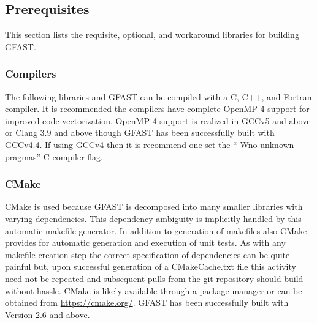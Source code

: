 \documentclass[12pt]{article}
\begin{document}
\subsection{Prerequisites}
This section lists the requisite, optional, and workaround libraries for building GFAST.   

\subsubsection{Compilers} 
The following libraries and GFAST can be compiled with a 
C, C++, and Fortran compiler.  It is recommended the compilers have complete 
\href{http://openmp.org/wp/}{OpenMP-4} support for improved code vectorization.  
OpenMP-4 support is realized in GCCv5 and above or Clang 3.9 and above though GFAST has
been successfully built with GCCv4.4.  If using GCCv4 then it is
recommend one set the ``-Wno-unknown-pragmas'' C compiler flag.

\subsubsection{CMake} CMake is used because GFAST is decomposed into many smaller libraries with 
varying dependencies.  This dependency ambiguity is implicitly handled by this automatic 
makefile generator. In addition to generation of makefiles also CMake provides for automatic generation
and execution of unit tests. As with any makefile creation step the correct 
specification of dependencies can be quite painful but, upon successful generation of a
CMakeCache.txt file this activity need not be repeated and subsequent pulls from the git
repository should build without hassle.  CMake is likely available through a package manager
or can be obtained from \url{https://cmake.org/}.  GFAST has been successfully built with
Version 2.6 and above.  
\end{document}
